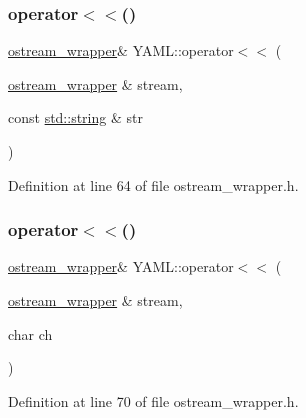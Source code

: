 \subsubsection{\texorpdfstring{operator$<$$<$()}{operator<<()}\hspace{0.1cm}{\footnotesize\ttfamily [10/35]}}
{\footnotesize\ttfamily \mbox{\hyperlink{class_y_a_m_l_1_1ostream__wrapper}{ostream\+\_\+wrapper}}\& Y\+A\+M\+L\+::operator$<$$<$ (\begin{DoxyParamCaption}\item[{\mbox{\hyperlink{class_y_a_m_l_1_1ostream__wrapper}{ostream\+\_\+wrapper}} \&}]{stream,  }\item[{const \mbox{\hyperlink{glad_8h_ac83513893df92266f79a515488701770}{std\+::string}} \&}]{str }\end{DoxyParamCaption})\hspace{0.3cm}{\ttfamily [inline]}}



Definition at line 64 of file ostream\+\_\+wrapper.\+h.

\mbox{\label{namespace_y_a_m_l_a0845c5f5426c45ca6a9aab75ee668b11}} 
\subsubsection{\texorpdfstring{operator$<$$<$()}{operator<<()}\hspace{0.1cm}{\footnotesize\ttfamily [11/35]}}
{\footnotesize\ttfamily \mbox{\hyperlink{class_y_a_m_l_1_1ostream__wrapper}{ostream\+\_\+wrapper}}\& Y\+A\+M\+L\+::operator$<$$<$ (\begin{DoxyParamCaption}\item[{\mbox{\hyperlink{class_y_a_m_l_1_1ostream__wrapper}{ostream\+\_\+wrapper}} \&}]{stream,  }\item[{char}]{ch }\end{DoxyParamCaption})\hspace{0.3cm}{\ttfamily [inline]}}



Definition at line 70 of file ostream\+\_\+wrapper.\+h.

\mbox{\label{namespace_y_a_m_l_ad72a35c39be1f1b4a74c7887919e5faf}} 
